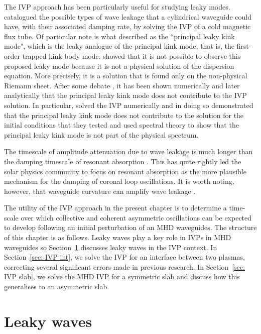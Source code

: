 The IVP approach has been particularly useful for studying leaky modes. \cite{cal03} catalogued the possible types of wave leakage that a cylindrical waveguide could have, with their associated damping rate, by solving the IVP of a cold magnetic flux tube. Of particular note is what \cite{cal03} described as the ``principal leaky kink mode", which is the leaky analogue of the principal kink mode, that is, the first-order trapped kink body mode. \cite{rud_etal06b} showed that it is not possible to observe this proposed leaky mode because it is not a physical solution of the dispersion equation. More precisely, it is a solution that is found only on the non-physical Riemann sheet. After some debate \citep{cal06,rud_etal06}, it has been shown numerically and later analytically that the principal leaky kink mode does not contribute to the IVP solution. In particular, \cite{ter_etal06} solved the IVP numerically and in doing so demonstrated that the principal leaky kink mode does not contribute to the solution for the initial conditions that they tested and \cite{and_etal07} used spectral theory to show that the principal leaky kink mode is not part of the physical spectrum.

The timescale of amplitude attenuation due to wave leakage is much longer than the damping timescale of resonant absorption \citep{rob19}. This has quite rightly led the solar physics community to focus on resonant absorption as the more plausible mechanism for the damping of coronal loop oscillations. It is worth noting, however, that waveguide curvature can amplify wave leakage \citep{sel_etal07}.

The utility of the IVP approach in the present chapter is to determine a time-scale over which collective and coherent asymmetric oscillations can be expected to develop following an initial perturbation of an MHD waveguides. The structure of this chapter is as follows. Leaky waves play a key role in IVPs in MHD waveguides so Section~\ref{sec: IVP leaky} discusses leaky waves in the IVP context. In Section~\ref{sec: IVP int}, we solve the IVP for an interface between two plasmas, correcting several significant errors made in previous research. In Section~\ref{sec: IVP slab}, we solve the MHD IVP for a symmetric slab and discuss how this generalises to an asymmetric slab.


\section{Leaky waves}
\label{sec: IVP leaky}

